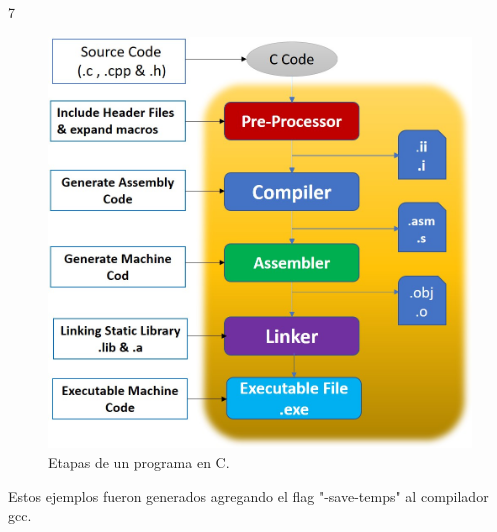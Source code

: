 7\documentclass[xcolor=pdftex,table,11pt]{beamer}
\begin{document}
   \begin{frame}
   \begin{figure}

\includegraphics[scale=0.35]{../img/exported/c_step_processes.jpg}
\caption{Etapas de un programa en C.}
\end{figure}
Estos ejemplos fueron generados agregando el flag "-save-temps" al compilador gcc. 


\end{frame}
\end{document}
